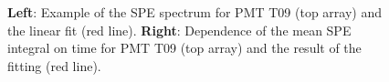 \documentclass[a4paper,11pt]{article}
\begin{document}
\begin{figure}[htbp]
  \begin{minipage}[ht]{0.49\linewidth}    
  \end{minipage}
  \hfill
  \begin{minipage}[ht]{0.49\linewidth}  
  \end{minipage}
    \caption{\textbf{Left}: Example of the SPE spectrum for PMT T09 (top array) and the linear fit (red line). \textbf{Right}: Dependence of the mean SPE integral on time for PMT T09 (top array) and the result of the fitting (red line).}
\label{img:spe2022}
\end{figure}
\end{document}
